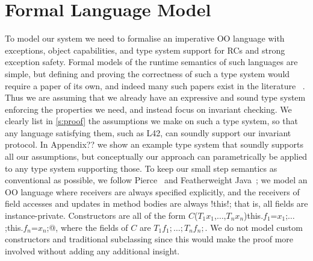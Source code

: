 \section{Formal Language Model}
\label{s:formalism}
To model our system we need to formalise an imperative OO language
with exceptions, object capabilities, and type system
support for RCs and strong exception safety.
Formal models of the runtime semantics of such languages are simple, but 
defining and proving the correctness of such a type system would require a paper
of its own, and indeed many such papers exist in the literature%
~\cite{ServettoEtAl13a,ServettoZucca15,GordonEtAl12,clebsch2015deny,JOT:issue_2011_01/article1}.
Thus we are assuming that we already have an expressive and sound type system enforcing the properties we need, and instead focus on invariant checking.
We clearly list in \ref{s:proof} the assumptions we make on such a type system, so that any language satisfying them, such as L42, can soundly support our invariant protocol.
In Appendix?? we show an example type system that soundly supports all our assumptions, but conceptually our approach can parametrically be applied to any type system supporting those.
To keep our small step semantics as conventional as possible, we follow Pierce~\cite{pierce2002types} and Featherweight Java~\cite{IgarashiEtAl01};
we model an OO language where receivers are always specified explicitly,
 and the receivers of field accesses and updates in method bodies are always \Q!this!; that is, all fields are instance-private.
Constructors are all of the form \Q@$C$($T_1 x_1$,$\ldots$,$T_n x_n$){this.$f_1$=$x_1$;$\ldots$;this.$f_n$=$x_n$;}@, where the fields of $C$ are $T_1 f_1;\ldots; T_n f_n;$.
We do not model custom constructors and traditional subclassing since this would make the proof more involved without adding any additional insight.


